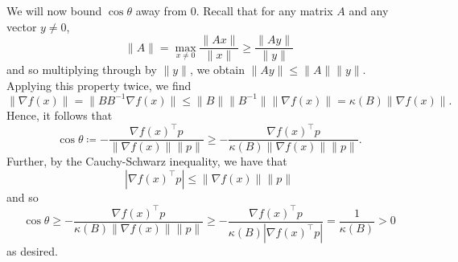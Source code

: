 \documentclass{../kin_math}
\begin{document}
\begin{questions}
\begin{solution}
    We will now bound $\cos \theta$ away from 0. Recall that for any matrix $A$ and any vector $y \neq 0$,
    \begin{equation*}
      \lVert A \rVert = \max_{x \neq 0} \frac{\lVert Ax \rVert}{\lVert x \rVert} \geq \frac{\lVert Ay \rVert}{\lVert y \rVert}
    \end{equation*}
    and so multiplying through by $\lVert y \rVert$, we obtain $\lVert Ay \rVert \leq \lVert A \rVert \lVert y \rVert$. Applying this property twice, we find
    \begin{equation*}
      \lVert \nabla f(x) \rVert = \lVert B B^{-1} \nabla f(x) \rVert \leq \lVert B \rVert \lVert B^{-1} \rVert \lVert \nabla f(x) \rVert = \kappa(B) \lVert \nabla f(x) \rVert.
    \end{equation*}
    Hence, it follows that
    \begin{equation*}
      \cos \theta \coloneqq - \frac{\nabla f(x)^\top p}{\lVert \nabla f(x) \rVert \lVert p \rVert} \geq - \frac{\nabla f(x)^\top p}{\kappa(B) \lVert \nabla f(x) \rVert \lVert p \rVert}.
    \end{equation*}
    Further, by the Cauchy-Schwarz inequality, we have that
    \begin{equation*}
      |\nabla f(x)^\top p | \leq \lVert \nabla f(x) \rVert \lVert p \rVert
    \end{equation*}
    and so
    \begin{equation*}
      \cos \theta \geq - \frac{\nabla f(x)^\top p}{\kappa(B) \lVert \nabla f(x) \rVert \lVert p \rVert} \geq - \frac{\nabla f(x)^\top p}{\kappa(B) |\nabla f(x)^\top p |} = \frac{1}{\kappa(B)} > 0
    \end{equation*}
    as desired.
  \end{solution}


\end{questions}
\end{document}
